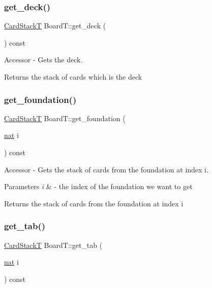 \subsubsection{\texorpdfstring{get\+\_\+deck()}{get\_deck()}}
{\footnotesize\ttfamily \hyperlink{_card_stack_8h_a29a6854caf5fec306ee8fc0c6b453837}{Card\+StackT} Board\+T\+::get\+\_\+deck (\begin{DoxyParamCaption}{ }\end{DoxyParamCaption}) const}



Accessor -\/ Gets the deck. 

\begin{DoxyReturn}{Returns}
the stack of cards which is the deck 
\end{DoxyReturn}
\mbox{\label{class_board_t_a176d67159552186af58350524a018778}} 
\subsubsection{\texorpdfstring{get\+\_\+foundation()}{get\_foundation()}}
{\footnotesize\ttfamily \hyperlink{_card_stack_8h_a29a6854caf5fec306ee8fc0c6b453837}{Card\+StackT} Board\+T\+::get\+\_\+foundation (\begin{DoxyParamCaption}\item[{\hyperlink{_card_types_8h_a56638ee9d162e8cce3a15f92d2023d6e}{nat}}]{i }\end{DoxyParamCaption}) const}



Accessor -\/ Gets the stack of cards from the foundation at index i. 


\begin{DoxyParams}{Parameters}
{\em i} & -\/ the index of the foundation we want to get \\
\hline
\end{DoxyParams}
\begin{DoxyReturn}{Returns}
the stack of cards from the foundation at index i 
\end{DoxyReturn}
\mbox{\label{class_board_t_a12d2088a51a0ac7d08294830f9bad379}} 
\subsubsection{\texorpdfstring{get\+\_\+tab()}{get\_tab()}}
{\footnotesize\ttfamily \hyperlink{_card_stack_8h_a29a6854caf5fec306ee8fc0c6b453837}{Card\+StackT} Board\+T\+::get\+\_\+tab (\begin{DoxyParamCaption}\item[{\hyperlink{_card_types_8h_a56638ee9d162e8cce3a15f92d2023d6e}{nat}}]{i }\end{DoxyParamCaption}) const}




